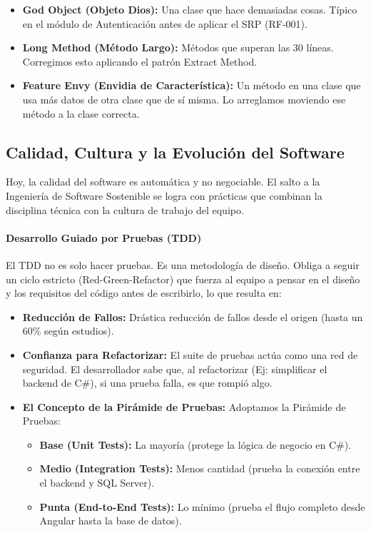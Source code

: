 \begin{itemize}
\item \textbf{God Object (Objeto Dios):} Una clase que hace demasiadas cosas. Típico en el módulo de Autenticación antes de aplicar el SRP (RF-001).

\item \textbf{Long Method (Método Largo):} Métodos que superan las 30 líneas. Corregimos esto aplicando el patrón Extract Method.

\item \textbf{Feature Envy (Envidia de Característica):} Un método en una clase que usa más datos de otra clase que de sí misma. Lo arreglamos moviendo ese método a la clase correcta.
\end{itemize}

\subsection{Calidad, Cultura y la Evolución del Software}

Hoy, la calidad del software es automática y no negociable. El salto a la Ingeniería de Software Sostenible se logra con prácticas que combinan la disciplina técnica con la cultura de trabajo del equipo.

\paragraph{Desarrollo Guiado por Pruebas (TDD)}

El TDD no es solo hacer pruebas. Es una metodología de diseño. Obliga a seguir un ciclo estricto (Red-Green-Refactor) que fuerza al equipo a pensar en el diseño y los requisitos del código antes de escribirlo, lo que resulta en:

\begin{itemize}
\item \textbf{Reducción de Fallos:} Drástica reducción de fallos desde el origen (hasta un 60\% según estudios).

\item \textbf{Confianza para Refactorizar:} El suite de pruebas actúa como una red de seguridad. El desarrollador sabe que, al refactorizar (Ej: simplificar el backend de C\#), si una prueba falla, es que rompió algo.

\item \textbf{El Concepto de la Pirámide de Pruebas:} Adoptamos la Pirámide de Pruebas:

\begin{itemize}
\item \textbf{Base (Unit Tests):} La mayoría (protege la lógica de negocio en C\#).

\item \textbf{Medio (Integration Tests):} Menos cantidad (prueba la conexión entre el backend y SQL Server).

\item \textbf{Punta (End-to-End Tests):} Lo mínimo (prueba el flujo completo desde Angular hasta la base de datos).
\end{itemize}
\end{itemize}


